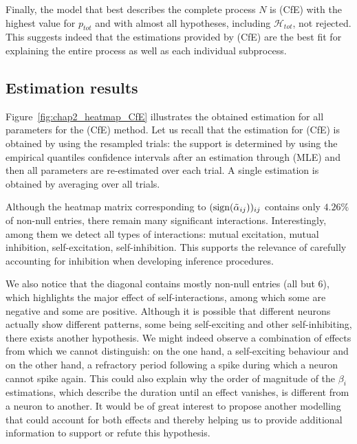  Finally, the model that best describes the complete process $N$ is (CfE) with the highest value for $p_{tot}$ and with almost all hypotheses, including $\mathcal{H}_{tot}$, not rejected. This suggests indeed that the estimations provided by (CfE) are the best fit for explaining the entire process as well as each individual subprocess.

\subsection{Estimation results} \label{sec:chap2_comment_neuron}
Figure~\ref{fig:chap2_heatmap_CfE} illustrates the obtained estimation for all parameters for the (CfE) method. 
Let us recall that the estimation for (CfE) is obtained by using the resampled trials: the support is determined by using the empirical quantiles confidence intervals after an estimation through (MLE) and then all parameters are re-estimated over each trial. A single estimation is obtained by averaging over all trials.

Although the heatmap matrix corresponding to $(\operatorname{sign}(\tilde\alpha_{ij}))_{ij}$ contains only $4.26\%$ of non-null entries, there remain many significant interactions. Interestingly, among them we detect all types of interactions: mutual excitation, mutual inhibition, self-excitation, self-inhibition. This supports the relevance of carefully accounting for inhibition when developing inference procedures.

We also notice that the diagonal contains mostly non-null entries (all but $6$), which highlights the major effect of self-interactions, among which some are negative and some are positive. Although it is possible that different neurons actually show different patterns, some being self-exciting and other self-inhibiting, there exists another hypothesis.  We might indeed observe a combination of effects from which we cannot distinguish: on the one hand, a self-exciting behaviour and on the other hand, a refractory period following a spike during which a neuron cannot spike again. This could also explain why the order of magnitude of the $\beta_i$ estimations, which describe the duration until an effect vanishes, is different from a neuron to another. It would be of great interest to propose another modelling that could account for both effects and thereby helping us to provide additional information to support or refute this hypothesis.


